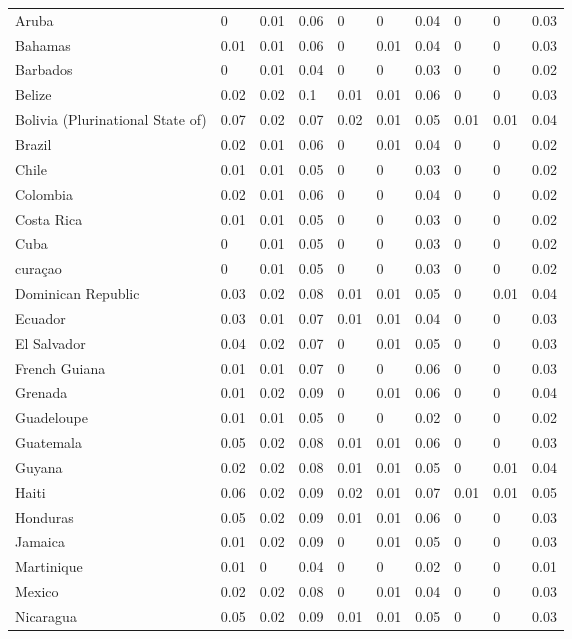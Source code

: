 \begin{longtable}[t]{llllllllll}
Aruba & 0 & 0.01 & 0.06 & 0 & 0 & 0.04 & 0 & 0 & 0.03\\
Bahamas & 0.01 & 0.01 & 0.06 & 0 & 0.01 & 0.04 & 0 & 0 & 0.03\\
Barbados & 0 & 0.01 & 0.04 & 0 & 0 & 0.03 & 0 & 0 & 0.02\\
Belize & 0.02 & 0.02 & 0.1 & 0.01 & 0.01 & 0.06 & 0 & 0 & 0.03\\
Bolivia (Plurinational State of) & 0.07 & 0.02 & 0.07 & 0.02 & 0.01 & 0.05 & 0.01 & 0.01 & 0.04\\
Brazil & 0.02 & 0.01 & 0.06 & 0 & 0.01 & 0.04 & 0 & 0 & 0.02\\
Chile & 0.01 & 0.01 & 0.05 & 0 & 0 & 0.03 & 0 & 0 & 0.02\\
Colombia & 0.02 & 0.01 & 0.06 & 0 & 0 & 0.04 & 0 & 0 & 0.02\\
Costa Rica & 0.01 & 0.01 & 0.05 & 0 & 0 & 0.03 & 0 & 0 & 0.02\\
Cuba & 0 & 0.01 & 0.05 & 0 & 0 & 0.03 & 0 & 0 & 0.02\\
curaçao & 0 & 0.01 & 0.05 & 0 & 0 & 0.03 & 0 & 0 & 0.02\\
Dominican Republic & 0.03 & 0.02 & 0.08 & 0.01 & 0.01 & 0.05 & 0 & 0.01 & 0.04\\
Ecuador & 0.03 & 0.01 & 0.07 & 0.01 & 0.01 & 0.04 & 0 & 0 & 0.03\\
El Salvador & 0.04 & 0.02 & 0.07 & 0 & 0.01 & 0.05 & 0 & 0 & 0.03\\
French Guiana & 0.01 & 0.01 & 0.07 & 0 & 0 & 0.06 & 0 & 0 & 0.03\\
Grenada & 0.01 & 0.02 & 0.09 & 0 & 0.01 & 0.06 & 0 & 0 & 0.04\\
Guadeloupe & 0.01 & 0.01 & 0.05 & 0 & 0 & 0.02 & 0 & 0 & 0.02\\
Guatemala & 0.05 & 0.02 & 0.08 & 0.01 & 0.01 & 0.06 & 0 & 0 & 0.03\\
Guyana & 0.02 & 0.02 & 0.08 & 0.01 & 0.01 & 0.05 & 0 & 0.01 & 0.04\\
Haiti & 0.06 & 0.02 & 0.09 & 0.02 & 0.01 & 0.07 & 0.01 & 0.01 & 0.05\\
Honduras & 0.05 & 0.02 & 0.09 & 0.01 & 0.01 & 0.06 & 0 & 0 & 0.03\\
Jamaica & 0.01 & 0.02 & 0.09 & 0 & 0.01 & 0.05 & 0 & 0 & 0.03\\
Martinique & 0.01 & 0 & 0.04 & 0 & 0 & 0.02 & 0 & 0 & 0.01\\
Mexico & 0.02 & 0.02 & 0.08 & 0 & 0.01 & 0.04 & 0 & 0 & 0.03\\
Nicaragua & 0.05 & 0.02 & 0.09 & 0.01 & 0.01 & 0.05 & 0 & 0 & 0.03\\

\end{longtable}

